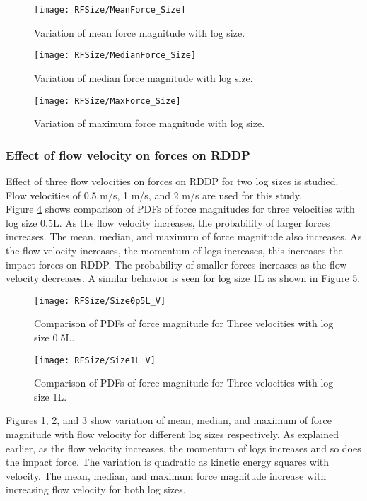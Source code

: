 \begin{figure}
\centering
\texttt{[image: RFSize/MeanForce\_Size]}
\caption{\label{fig:RFMeanForce_Size}Variation of mean force magnitude with log size.}
\end{figure} 
\begin{figure}
\centering
\texttt{[image: RFSize/MedianForce\_Size]}
\caption{\label{fig:RFMedianForce_Size}Variation of median force magnitude with log size.}
\end{figure} 
\begin{figure}
\centering
\texttt{[image: RFSize/MaxForce\_Size]}
\caption{\label{fig:RFMaxForce_Size}Variation of maximum force magnitude with log size.}
\end{figure} 

\subsubsection{Effect of flow velocity on forces on RDDP}
Effect of three flow velocities on forces on RDDP  for two log sizes is studied. Flow velocities of 0.5 m/s, 1 m/s, and 2 m/s are used for this study.\\
Figure \ref{fig:RFSize0p5L_V} shows comparison of PDFs of force magnitudes for three velocities with log size 0.5L. As the flow velocity increases, the probability of larger forces increases. The mean, median, and maximum of force magnitude also increases. As the flow velocity increases, the momentum of logs increases, this increases the impact forces on RDDP. The probability of smaller forces increases as the flow velocity decreases. A similar behavior is seen for log size 1L as shown in Figure \ref{fig:RFSize1L_V}.

\begin{figure}
\centering
\texttt{[image: RFSize/Size0p5L\_V]}
\caption{\label{fig:RFSize0p5L_V}Comparison of PDFs of force magnitude for Three velocities with log size 0.5L.}
\end{figure} 
\begin{figure}
\centering
\texttt{[image: RFSize/Size1L\_V]}
\caption{\label{fig:RFSize1L_V}Comparison of PDFs of force magnitude for Three velocities with log size 1L.}
\end{figure}

\noindent Figures \ref{fig:RFMeanForce_Size}, \ref{fig:RFMedianForce_Size}, and \ref{fig:RFMaxForce_Size} show variation of mean, median, and maximum of force magnitude with flow velocity for different log sizes respectively. As explained earlier, as the flow velocity increases, the momentum of logs increases and so does the impact force. The variation is quadratic as kinetic energy squares with velocity. The mean, median, and maximum force magnitude increase with increasing flow velocity for both log sizes. 

